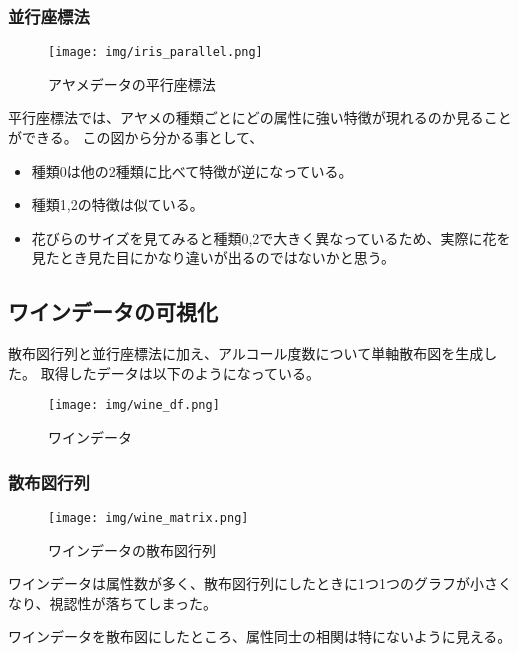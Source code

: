 \documentclass{jsarticle}
\begin{document}
\subsubsection{並行座標法}
\begin{figure}[htbp]
    \begin{center}
        \texttt{[image: img/iris\_parallel.png]}
        \caption{アヤメデータの平行座標法}
        \label{fig:iris_parallel}
    \end{center}
\end{figure}
平行座標法では、アヤメの種類ごとにどの属性に強い特徴が現れるのか見ることができる。
この図から分かる事として、
\begin{itemize}
    \item 種類0は他の2種類に比べて特徴が逆になっている。
    \item 種類1,2の特徴は似ている。
    \item 花びらのサイズを見てみると種類0,2で大きく異なっているため、実際に花を見たとき見た目にかなり違いが出るのではないかと思う。
\end{itemize}
\subsection{ワインデータの可視化}
散布図行列と並行座標法に加え、アルコール度数について単軸散布図を生成した。
取得したデータは以下のようになっている。
\begin{figure}[htbp]
    \begin{center}
        \texttt{[image: img/wine\_df.png]}
        \caption{ワインデータ}
        \label{fig:wine_df}
    \end{center}
\end{figure}
\subsubsection{散布図行列}
\begin{figure}[htbp]
    \begin{center}
        \texttt{[image: img/wine\_matrix.png]}
        \caption{ワインデータの散布図行列}
        \label{fig:wine_matrix}
    \end{center}
\end{figure}
ワインデータは属性数が多く、散布図行列にしたときに1つ1つのグラフが小さくなり、視認性が落ちてしまった。
\par ワインデータを散布図にしたところ、属性同士の相関は特にないように見える。
\end{document}
